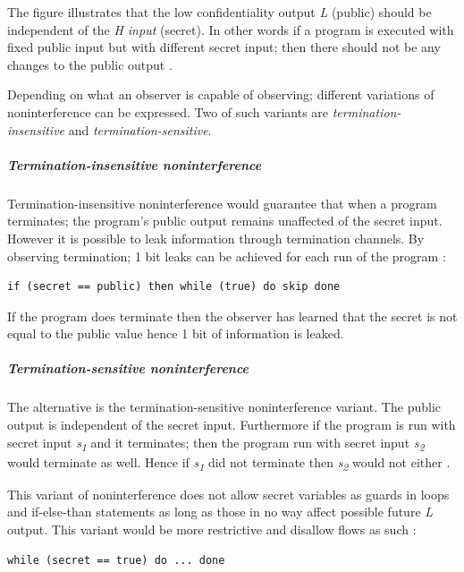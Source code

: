 The figure illustrates that the low confidentiality output \emph{L} (public) should be independent of the \emph{H input} (secret). In other words if a program is executed with fixed public input but with different secret input; then there should not be any changes to the public output \cite{Hedin2011}.


Depending on what an observer is capable of observing; different variations of noninterference can be expressed. Two of such variants are \emph{termination-insensitive} and \emph{termination-sensitive}.


\subparagraph{Termination-insensitive noninterference}

Termination-insensitive noninterference would guarantee that when a program terminates; the program's public output remains unaffected of the secret input. However it is possible to leak information through termination channels. By observing termination; 1 bit leaks can be achieved for each run of the program \cite{Hedin2011}:

\begin{lstlisting}
if (secret == public) then while (true) do skip done
\end{lstlisting}

If the program does terminate then the observer has learned that the secret is not equal to the public value hence 1 bit of information is leaked. 


\subparagraph{Termination-sensitive noninterference}
The alternative is the termination-sensitive noninterference variant. The public output is independent of the secret input. Furthermore if the program is run with secret input \emph{s\textsubscript{1}} and it terminates; then the program run with secret input \emph{s\textsubscript{2}} would terminate as well. Hence if \emph{s\textsubscript{1}} did not terminate then \emph{s\textsubscript{2}} would not either \cite{Hedin2011}.

This variant of noninterference does not allow secret variables as guards in loops  and if-else-than statements as long as those in no way affect possible future \emph{L} output. This variant would be more restrictive and disallow flows as such \cite{Hedin2011}:

\begin{lstlisting}
while (secret == true) do ... done
\end{lstlisting}

